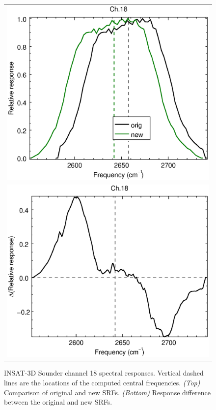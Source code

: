 \begin{figure}[H]
  \centering
  \begin{tabular}{c}
    \includegraphics[scale=0.55]{graphics/sndr/srf/sndr_insat3d-18.eps} \\
    \includegraphics[scale=0.55]{graphics/sndr/srf/sndr_insat3d-18.difference.eps}
  \end{tabular}
  \caption{INSAT-3D Sounder channel 18 spectral responses. Vertical dashed lines are the locations of the computed central frequencies. \emph{(Top)} Comparison of original and new SRFs. \emph{(Bottom)} Response difference between the original and new SRFs.}
  \label{fig:sndr_ch18}
\end{figure}


